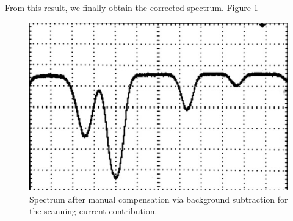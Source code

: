 From this result, we finally obtain the corrected spectrum. Figure \ref{fig:spectrum} 

\begin{figure}[H]
    \centering
    \includegraphics[width=0.72\linewidth]{content/measurement/spectrum.jpg}
    \captionsetup{width=0.8\linewidth}
    \caption{Spectrum after manual compensation via background subtraction for the scanning current contribution.}
    \label{fig:spectrum}
\end{figure}
